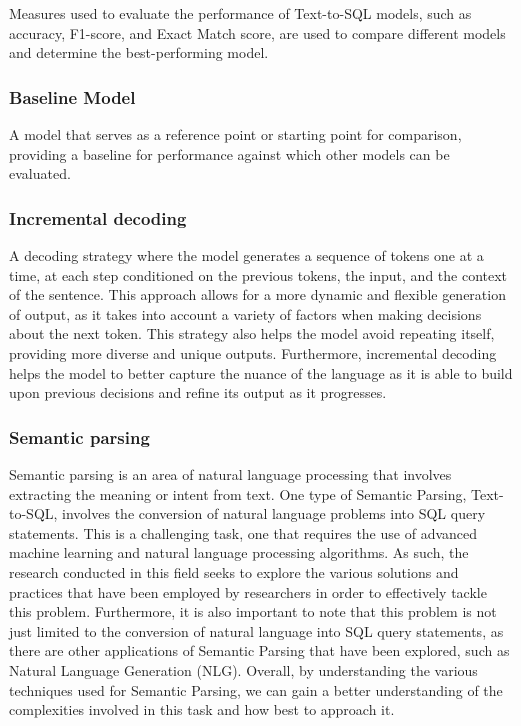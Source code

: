 Measures used to evaluate the performance of Text-to-SQL models, such as accuracy, F1-score, and Exact Match score, are used to compare different models and determine the best-performing model.

\subsubsection{Baseline Model}

A model that serves as a reference point or starting point for comparison, providing a baseline for performance against which other models can be evaluated.

\subsubsection{Incremental decoding}

A decoding strategy where the model generates a sequence of tokens one at a time, at each step conditioned on the previous tokens, the input, and the context of the sentence. This approach allows for a more dynamic and flexible generation of output, as it takes into account a variety of factors when making decisions about the next token. This strategy also helps the model avoid repeating itself, providing more diverse and unique outputs. Furthermore, incremental decoding helps the model to better capture the nuance of the language as it is able to build upon previous decisions and refine its output as it progresses\cite{huang-mi-2010-efficient}.

\subsubsection{Semantic parsing}

Semantic parsing\cite{krishnamurthy-etal-2017-neural} is an area of natural language processing that involves extracting the meaning or intent from text. One type of Semantic Parsing, Text-to-SQL, involves the conversion of natural language problems into SQL query statements. This is a challenging task, one that requires the use of advanced machine learning and natural language processing algorithms. As such, the research conducted in this field seeks to explore the various solutions and practices that have been employed by researchers in order to effectively tackle this problem. Furthermore, it is also important to note that this problem is not just limited to the conversion of natural language into SQL query statements, as there are other applications of Semantic Parsing that have been explored, such as Natural Language Generation (NLG). Overall, by understanding the various techniques used for Semantic Parsing, we can gain a better understanding of the complexities involved in this task and how best to approach it.
